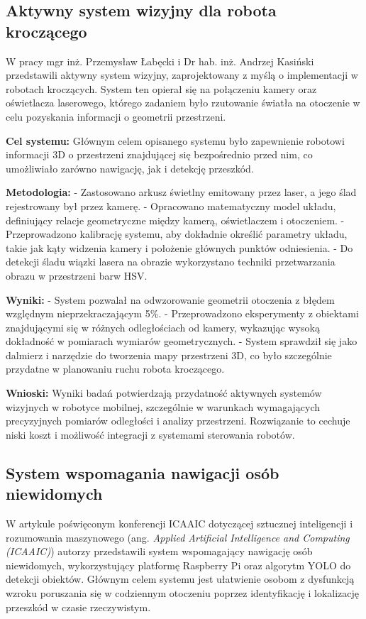 \documentclass[a4paper,twoside,12pt]{book}
\begin{document}
\subsection{Aktywny system wizyjny dla robota kroczącego}

W pracy \cite{bib:labkecki2009aktywny} mgr inż. Przemysław Łabęcki i Dr hab. inż. Andrzej Kasiński przedstawili aktywny system wizyjny, zaprojektowany z myślą o implementacji w robotach kroczących. System ten opierał się na połączeniu kamery oraz oświetlacza laserowego, którego zadaniem było rzutowanie światła na otoczenie w celu pozyskania informacji o geometrii przestrzeni.

\textbf{Cel systemu:}
Głównym celem opisanego systemu było zapewnienie robotowi informacji 3D o przestrzeni znajdującej się bezpośrednio przed nim, co umożliwiało zarówno nawigację, jak i detekcję przeszkód.

\textbf{Metodologia:}
- Zastosowano arkusz świetlny emitowany przez laser, a jego ślad rejestrowany był przez kamerę.
- Opracowano matematyczny model układu, definiujący relacje geometryczne między kamerą, oświetlaczem i otoczeniem.
- Przeprowadzono kalibrację systemu, aby dokładnie określić parametry układu, takie jak kąty widzenia kamery i położenie głównych punktów odniesienia.
- Do detekcji śladu wiązki lasera na obrazie wykorzystano techniki przetwarzania obrazu w przestrzeni barw HSV.

\textbf{Wyniki:}
- System pozwalał na odwzorowanie geometrii otoczenia z błędem względnym nieprzekraczającym 5\%.
- Przeprowadzono eksperymenty z obiektami znajdującymi się w różnych odległościach od kamery, wykazując wysoką dokładność w pomiarach wymiarów geometrycznych.
- System sprawdził się jako dalmierz i narzędzie do tworzenia mapy przestrzeni 3D, co było szczególnie przydatne w planowaniu ruchu robota kroczącego.

\textbf{Wnioski:}
Wyniki badań potwierdzają przydatność aktywnych systemów wizyjnych w robotyce mobilnej, szczególnie w warunkach wymagających precyzyjnych pomiarów odległości i analizy przestrzeni. Rozwiązanie to cechuje niski koszt i możliwość integracji z systemami sterowania robotów.


\subsection{System wspomagania nawigacji osób niewidomych}

W artykule \cite{bib:parvadhavardhni2023blind} poświęconym konferencji ICAAIC dotyczącej sztucznej inteligencji i rozumowania maszynowego (ang. \textit{Applied Artificial Intelligence and Computing (ICAAIC)}) autorzy przedstawili system wspomagający nawigację osób niewidomych, wykorzystujący platformę Raspberry Pi oraz algorytm YOLO do detekcji obiektów. Głównym celem systemu jest ułatwienie osobom z dysfunkcją wzroku poruszania się w codziennym otoczeniu poprzez identyfikację i lokalizację przeszkód w czasie rzeczywistym.
\end{document}
